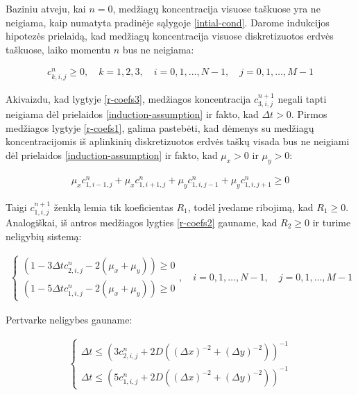 Baziniu atveju, kai $n=0$, medžiagų koncentracija visuose taškuose yra ne neigiama, kaip numatyta pradinėje sąlygoje \eqref{intial-cond}. Darome indukcijos hipotezės prielaidą, kad medžiagų koncentracija visuose diskretizuotos erdvės taškuose, laiko momentu $n$ bus ne neigiama:

\begin{align} \label{induction-assumption}
    c^n_{k,i,j} \geqslant 0, \quad k=1,2,3,\quad i=0,1,\dots,N-1,\quad j=0,1,\dots,M-1
\end{align}

Akivaizdu, kad lygtyje \eqref{r-coefs3}, medžiagos koncentracija $c^{n+1}_{3,i,j}$ negali tapti neigiama dėl prielaidos \eqref{induction-assumption} ir fakto, kad $\Delta t>0$. Pirmos medžiagos lygtyje \eqref{r-coefs1}, galima pastebėti, kad dėmenys su medžiagų koncentracijomis iš aplinkinių diskretizuotos erdvės taškų visada bus ne neigiami dėl prielaidos \eqref{induction-assumption} ir fakto, kad $\mu_x>0$ ir $\mu_y>0$:

\begin{align*}
    \mu_xc^n_{1,i-1,j}+\mu_xc^n_{1,i+1,j}+\mu_yc^n_{1,i,j-1}+\mu_yc^n_{1,i,j+1}\geqslant 0
\end{align*}

Taigi $c^{n+1}_{1,i,j}$ ženklą lemia tik koeficientas $R_1$, todėl įvedame ribojimą, kad $R_1\geqslant 0$. Analogiškai, iš antros medžiagos lygties \eqref{r-coefs2} gauname, kad $R_2\geqslant 0$ ir turime neligybių sistemą:

\begin{align}
  \begin{cases}
    (1-3\Delta tc^{n}_{2,i,j}-2(\mu_x+\mu_y))\geqslant 0\\
    (1-5\Delta tc^{n}_{1,i,j}-2(\mu_x+\mu_y))\geqslant 0
  \end{cases}, \quad i=0,1,\dots,N-1, \quad j=0,1,\dots,M-1
\end{align}

Pertvarke neligybes gauname:

\begin{align}
  \begin{cases}
    \Delta t \leqslant (3c^{n}_{2,i,j}+2D((\Delta x)^{-2}+(\Delta y)^{-2}))^{-1}\\
    \Delta t \leqslant (5c^{n}_{1,i,j}+2D((\Delta x)^{-2}+(\Delta y)^{-2}))^{-1}
  \end{cases}
\end{align}



